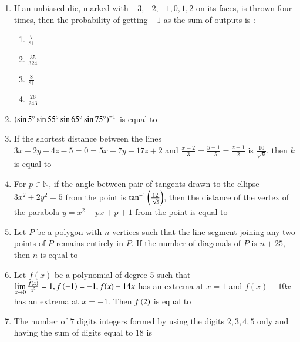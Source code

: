\documentclass[journal]{IEEEtran}
\begin{document}
\begin{enumerate}[start=16]
\item If an unbiased die, marked with $-3,-2,-1,0,1,2$ on its faces, is thrown four times, then the probability of getting $-1$ as the sum of outputs is :
\begin{enumerate}
    \item $\frac{7}{81}$
    \item $\frac{35}{324}$
    \item $\frac{8}{81}$
    \item $\frac{26}{243}$
\end{enumerate}

\item $\left( \sin 5^\circ \sin 55^\circ \sin 65^\circ \sin 75^\circ\right)^{-1}$ is equal to \underline{\hspace{1cm}}\\

\item If the shortest distance between the lines \\
$3x+2y-4z-5=0=5x-7y-17z+2$ and $\frac{x-2}{3}=\frac{y-1}{-5}=\frac{z+1}{2}$ is $\frac{10}{\sqrt{k}}$, then $k$ is equal to \underline{\hspace{1cm}}\\

\item For $p \in \mathbb N$, if the angle between pair of tangents drawn to the ellipse $3x^{2}+2y^{2}=5$ from the point  is $\tan^{-1}\left(\frac{12}{\sqrt{5}}\right)$, then the distance of the vertex of the parabola $y=x^2-px+p+1$ from the point  is equal to \underline{\hspace{1cm}}\\

\item Let $P$ be a polygon with $n$ vertices such that the line segment joining any two points of $P$ remains entirely in $P$. If the number of diagonals of $P$ is $n+25$, then $n$ is equal to \underline{\hspace{1cm}}\\

\item Let $f(x)$ be a polynomial of degree 5 such that $\lim\limits_{x\to 0}\frac{f(x)}{x^2}=1, f\left(-1\right)=-1, f(x)-14x$ has an extrema at $x=1$ and $f(x)-10x$ has an extrema at $x=-1$. Then $f\left(2\right)$ is equal to \underline{\hspace{1cm}}\\

\item The number of $7$ digits integers formed by using the digits $2,3,4,5$ only and having the sum of digits equal to $18$ is \underline{\hspace{1cm}}\\


\end{enumerate}
\end{document}
